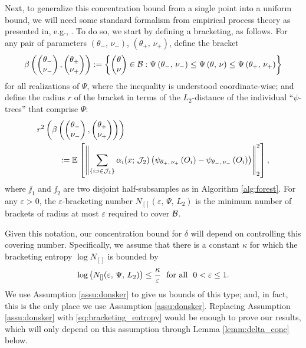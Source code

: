 \documentclass[aos]{imsart}
\theoremstyle{plain}
\theoremstyle{definition}
\theoremstyle{remark}
\begin{document}
\begin{CJK}{UTF8}{gbsn}
{\begin{appendix}
Next, to generalize this concentration bound from a single point into a uniform bound,
we will need some standard formalism from empirical process theory
as presented in, e.g., \citet{van1996weak}. To do so, we start by defining a
bracketing, as follows. For any pair of parameters $(\theta_{-}, \, \nu_{-})$,
$(\theta_{+}, \, \nu_{+})$, define the bracket
$$ \beta\p{\begin{pmatrix} \theta_{-} \\ \nu_{-} \end{pmatrix},
\begin{pmatrix} \theta_{+} \\ \nu_{+} \end{pmatrix}}
: = \cb{\begin{pmatrix} \theta \\ \nu \end{pmatrix} \in \bb : 
\Psi\p{\theta_{-}, \, \nu_{-}}
\leq \Psi\p{\theta, \, \nu}
\leq \Psi\p{\theta_{+}, \, \nu_{+}}} $$
for all realizations of $\Psi$, where the inequality is
understood coordinate-wise; and define the radius $r$
of the bracket in terms of the $L_2$-distance of the individual ``$\psi$-trees''
that comprise $\Psi$:
\begin{equation}
\label{eq:bracketing_radius}
\begin{split}
&r^2\p{\beta\p{\begin{pmatrix} \theta_{-} \\ \nu_{-} \end{pmatrix},
\begin{pmatrix} \theta_{+} \\ \nu_{+} \end{pmatrix}}} \\
&\ \ \ \ \ \ \ \
:= \EE{\Norm{\sum_{\cb{i : i \in \jj_1}} \alpha_i(x; \, \jj_2) \p{\psi_{\theta_+, \, \nu_+}\p{O_i} - \psi_{\theta_-, \, \nu_-}\p{O_i}}}_2^2},
\end{split}
\end{equation}
where $\jj_1$ and $\jj_2$ are two disjoint half-subsamples as in Algorithm \ref{alg:forest}.
For any $\varepsilon > 0$, the $\varepsilon$-bracketing number
$N_{[]}(\varepsilon, \, \Psi, \, L_2)$ is the minimum number of brackets of
radius at most $\varepsilon$ required to cover $\mathcal{B}$.

Given this notation, our concentration bound for $\delta$ will depend
on controlling this covering number. Specifically, we assume that there is a
constant $\kappa$ for which the bracketing entropy $\log N_{[]}$ is bounded by
\begin{equation}
\label{eq:bracketing_entropy}
\log\p{N_{[]}(\varepsilon, \, \Psi, \, L_2)} \leq \frac{\kappa}{\varepsilon} \ \text{ for all } \ 0 < \varepsilon \leq 1.
\end{equation}
We use Assumption \ref{assu:donsker} to give us bounds of this type; and, in fact,
this is the only place we use Assumption \ref{assu:donsker}. Replacing Assumption
\ref{assu:donsker} with \eqref{eq:bracketing_entropy} would be enough to prove our results,
which will only depend on this assumption through Lemma \ref{lemm:delta_conc} below.


\end{appendix}}
\end{CJK}
\end{document}

